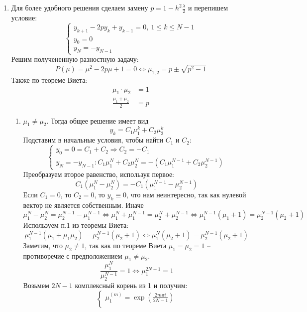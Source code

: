 \begin{task}
\begin{enumerate}
    \item Для более удобного решения сделаем замену $p=1-h^2\frac{\lambda}{2}$ и перепишем условие:
          \[\begin{cases}
              y_{k+1}-2py_k+y_{k-1} = 0,\ 1 \leq k \leq N-1 \\
              y_0 = 0                                       \\
              y_N = -y_{N-1}
            \end{cases}\]
          Решим получененную разностную задачу:
          \[P(\mu) = \mu^2-2p\mu+1 = 0 \Leftrightarrow \mu_{1,2}=p \pm \sqrt{p^2-1}\]
          Также по теореме Виета:
          \begin{align}
            \mu_1\cdot \mu_2      & =1  \\
            \frac{\mu_1+\mu_2}{2} & = p
          \end{align}
          \begin{enumerate}
            \item $\mu_1\neq\mu_2$. Тогда общее решение имеет вид
                  \[y_k=C_1\mu_1^k+C_2\mu_2^k\]
                  Подставим в начальные условия, чтобы найти $C_1$ и $C_2$:
                  \[\begin{cases}
                      y_0 = 0 = C_1+C_2\Rightarrow C_2=-C_1 \\
                      y_N=-y_{N-1}: C_1\mu_1^N+C_2\mu_2^N = -(C_1\mu_1^{N-1}+C_2\mu_2^{N-1})
                    \end{cases}\]
                  Преобразуем второе равенство, используя первое:
                  \[C_1(\mu_1^N-\mu_2^N)=-C_1(\mu_1^{N-1}-\mu_2^{N-1})\]
                  Если $C_1 = 0$, то $C_2=0$, то $y_k\equiv 0$, что нам неинтересно, так как нулевой вектор не является собственным. Иначе
                  \[\mu_1^N-\mu_2^N=\mu_2^{N-1}-\mu_1^{N-1} \Leftrightarrow
                    \mu_1^N+\mu_1^{N-1}=\mu_2^N+\mu_2^{N-1} \Leftrightarrow
                    \mu_1^{N-1}(\mu_1+1)=\mu_2^{N-1}(\mu_2+1)\]
                  Используем п.1 из теоремы Виета:
                  \[\mu_1^{N-1}(\mu_1+\mu_1\mu_2)=\mu_2^{N-1}(\mu_2+1)\Leftrightarrow\mu_1^N(\mu_2+1)=\mu_2^{N-1}(\mu_2+1)\]
                  Заметим, что $\mu_2\neq 1$, так как по теореме Виета $\mu_1=\mu_2=1$ -- противоречие с предположением $\mu_1\neq\mu_2$.
                  \[\frac{\mu_1^N}{\mu_2^{N-1}}=1\Leftrightarrow\mu_1^{2N-1}=1\]
                  Возьмем $2N-1$ комплексный корень из 1 и получим:
                  \[\begin{cases}
                      \mu_1^{(m)} = \exp\left(\frac{2m\pi i}{2N-1}\right)  \\

\end{cases}\]
\end{enumerate}
\end{enumerate}
\end{task}
